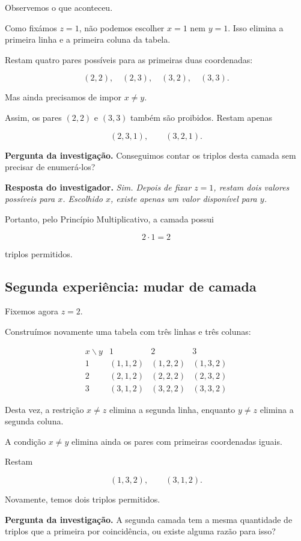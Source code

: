 \documentclass[11pt,a4paper,oneside]{book}
\newcommand{\Pergunta}[1]{\begin{perguntabox}\textbf{Pergunta da investigação.} #1\end{perguntabox}}
\newcommand{\Resposta}[1]{\textcolor{verdeescuro}{\textbf{Resposta do investigador.}} \emph{#1}\par}
\begin{document}
Observemos o que aconteceu.

Como fixámos $z=1$, não podemos escolher $x=1$ nem
$y=1$. Isso elimina a primeira linha e a primeira
coluna da tabela.

Restam quatro pares possíveis para as primeiras duas
coordenadas:

\[
(2,2),\quad(2,3),\quad(3,2),\quad(3,3).
\]

Mas ainda precisamos de impor $x\neq y$.

Assim, os pares $(2,2)$ e $(3,3)$ também são proibidos.
Restam apenas

\[
(2,3,1),\qquad(3,2,1).
\]

\Pergunta{Conseguimos contar os triplos desta camada
sem precisar de enumerá-los?}

\Resposta{Sim. Depois de fixar $z=1$, restam dois
valores possíveis para $x$. Escolhido $x$, existe
apenas um valor disponível para $y$.}

Portanto, pelo Princípio Multiplicativo, a camada
possui

\[
2\cdot1=2
\]

triplos permitidos.

\subsection*{Segunda experiência: mudar de camada}

Fixemos agora $z=2$.

Construímos novamente uma tabela com três linhas
e três colunas:

\[
\begin{array}{c|ccc}
x\backslash y & 1 & 2 & 3\\ \hline
1 &(1,1,2)&(1,2,2)&\boxed{(1,3,2)}\\[3pt]
2 &(2,1,2)&(2,2,2)&(2,3,2)\\[3pt]
3 &\boxed{(3,1,2)}&(3,2,2)&(3,3,2)
\end{array}
\]

Desta vez, a restrição $x\neq z$ elimina a segunda
linha, enquanto $y\neq z$ elimina a segunda coluna.

A condição $x\neq y$ elimina ainda os pares com
primeiras coordenadas iguais.

Restam

\[
(1,3,2),\qquad(3,1,2).
\]

Novamente, temos dois triplos permitidos.

\Pergunta{A segunda camada tem a mesma quantidade de
triplos que a primeira por coincidência, ou existe
alguma razão para isso?}
\end{document}
